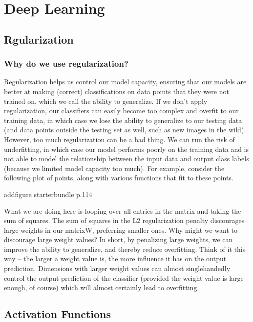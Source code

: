 \chapter{   Deep Learning}
\graphicspath{{./images/computer_vision/}}

\section{Rgularization}

\subsection{Why do we use regularization?}
Regularization helps us control our model capacity, ensuring that our models are better at
making (correct) classifications on data points that they were not trained on, which we call the
ability to generalize. If we don’t apply regularization, our classifiers can easily become too complex
and overfit to our training data, in which case we lose the ability to generalize to our testing data
(and data points outside the testing set as well, such as new images in the wild).
However, too much regularization can be a bad thing. We can run the risk of underfitting, in
which case our model performs poorly on the training data and is not able to model the relationship
between the input data and output class labels (because we limited model capacity too much). For
example, consider the following plot of points, along with various functions that fit to these points.

addfigure starterbundle p.114




What we are doing here is looping over all entries in the matrix and taking the sum of squares.
The sum of squares in the L2 regularization penalty discourages large weights in our matrixW,
preferring smaller ones. Why might we want to discourage large weight values? In short, by
penalizing large weights, we can improve the ability to generalize, and thereby reduce overfitting.
Think of it this way – the larger a weight value is, the more influence it has on the output
prediction. Dimensions with larger weight values can almost singlehandedly control the output
prediction of the classifier (provided the weight value is large enough, of course) which will almost
certainly lead to overfitting.



\section{Activation Functions}